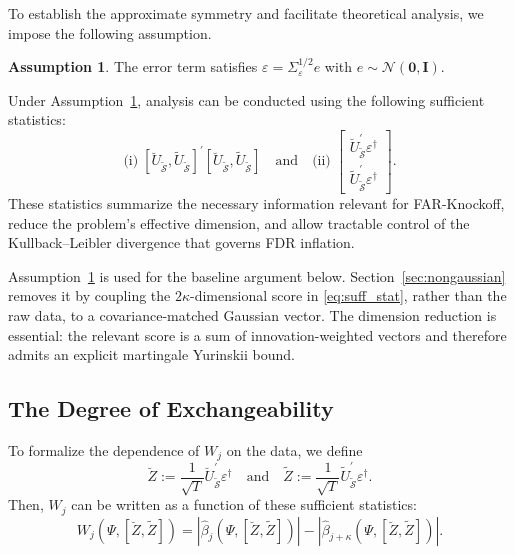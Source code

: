 ﻿\documentclass[12pt]{article}
\newcommand{\0}{\mbox{\bf 0}}
\theoremstyle{plain}%
\theoremstyle{definition}
\newtheorem{assumption}{Assumption}
\begin{document}
{To establish the approximate symmetry and facilitate theoretical analysis, we impose the following assumption.

\begin{assumption}
\label{ass:normality}
The error term satisfies $\varepsilon = \Sigma_\varepsilon^{1/2} e$ with $e \sim \mathcal{N}(\mathbf{0}, \mathbf{I})$.
\end{assumption}
 

Under Assumption~\ref{ass:normality}, analysis can be conducted using the following sufficient statistics:
\begin{equation}
\text{(i)} \; [\breve{U}_{\widetilde{\mathcal{S}}}, \widetilde{U}_{\widetilde{\mathcal{S}}}]^{\prime}[\breve{U}_{\widetilde{\mathcal{S}}},
\widetilde{U}_{\widetilde{\mathcal{S}}}]
\quad \text{and} \quad
\text{(ii)} \; \left[\begin{array}{c}
\breve{U}_{\widetilde{\mathcal{S}}}^{\prime} \varepsilon^{\dagger} \\
\widetilde{U}_{\widetilde{\mathcal{S}}}^{\prime} \varepsilon^{\dagger}
\end{array}\right].
\label{eq:suff_stat}
\end{equation}
These statistics summarize the necessary information relevant for FAR-Knockoff, reduce the problem's effective dimension, and allow tractable control of the Kullback--Leibler divergence that governs FDR inflation.


Assumption~\ref{ass:normality} is used for the baseline argument below.
Section~\ref{sec:nongaussian} removes it by coupling the
$2\kappa$-dimensional score in \eqref{eq:suff_stat}, rather than the raw
data, to a covariance-matched Gaussian vector.  The dimension reduction is
essential: the relevant score is a sum of innovation-weighted vectors and
therefore admits an explicit martingale Yurinskii bound.






\subsection{The Degree of Exchangeability}
\label{sec:degree_exchange}

To formalize the dependence of $W_j$ on the data, we define
\begin{equation}
\breve{Z} := \frac{1}{\sqrt{T}} \breve{U}_{\widetilde{\mathcal{S}}}^{\prime} \varepsilon^{\dagger}
\quad \text{and} \quad
\widetilde{Z} := \frac{1}{\sqrt{T}} \widetilde{U}_{\widetilde{\mathcal{S}}}^{\prime} \varepsilon^{\dagger}.
\end{equation}
Then, $W_j$ can be written as a function of these sufficient statistics:
\begin{equation}
W_j(\Psi, [\breve{Z}, \widetilde{Z}]) = \left| \widehat{\beta}_j(\Psi, [\breve{Z}, \widetilde{Z}]) \right| - \left| \widehat{\beta}_{j+\kappa}(\Psi, [\breve{Z}, \widetilde{Z}]) \right|.
\end{equation}


}
\end{document}
